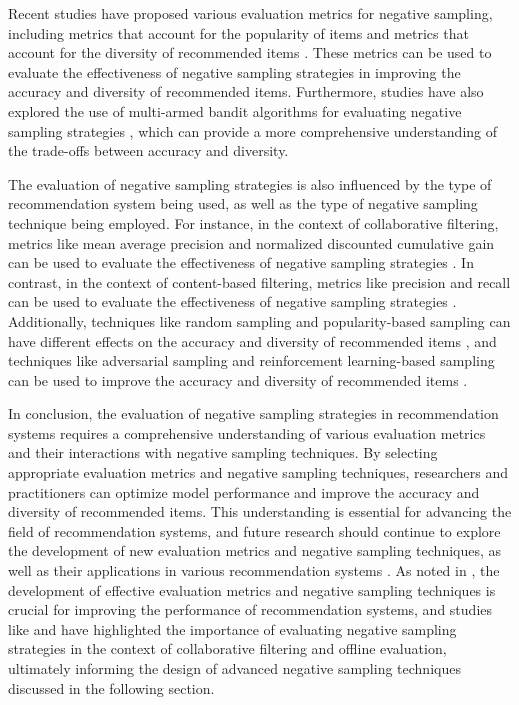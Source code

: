 \documentclass[11pt,a4paper]{article}
\begin{document}
Recent studies have proposed various evaluation metrics for negative sampling, including metrics that account for the popularity of items \cite{arxiv:1802.05382} and metrics that account for the diversity of recommended items \cite{arxiv:1905.06589}. These metrics can be used to evaluate the effectiveness of negative sampling strategies in improving the accuracy and diversity of recommended items. Furthermore, studies have also explored the use of multi-armed bandit algorithms for evaluating negative sampling strategies \cite{doi:10.1287/opre.2016.1508}, which can provide a more comprehensive understanding of the trade-offs between accuracy and diversity.

The evaluation of negative sampling strategies is also influenced by the type of recommendation system being used, as well as the type of negative sampling technique being employed. For instance, in the context of collaborative filtering, metrics like mean average precision and normalized discounted cumulative gain can be used to evaluate the effectiveness of negative sampling strategies \cite{doi:10.23919/eusipco.2017.8081498}. In contrast, in the context of content-based filtering, metrics like precision and recall can be used to evaluate the effectiveness of negative sampling strategies \cite{doi:10.24963/ijcai.2017/446}. Additionally, techniques like random sampling and popularity-based sampling can have different effects on the accuracy and diversity of recommended items \cite{doi:10.1016/j.knosys.2011.07.021}, and techniques like adversarial sampling and reinforcement learning-based sampling can be used to improve the accuracy and diversity of recommended items \cite{doi:10.1145/3097983.3098202}.

In conclusion, the evaluation of negative sampling strategies in recommendation systems requires a comprehensive understanding of various evaluation metrics and their interactions with negative sampling techniques. By selecting appropriate evaluation metrics and negative sampling techniques, researchers and practitioners can optimize model performance and improve the accuracy and diversity of recommended items. This understanding is essential for advancing the field of recommendation systems, and future research should continue to explore the development of new evaluation metrics and negative sampling techniques, as well as their applications in various recommendation systems \cite{arxiv:1707.07435}. As noted in \cite{doi:10.1587/transinf.2017edr0003}, the development of effective evaluation metrics and negative sampling techniques is crucial for improving the performance of recommendation systems, and studies like \cite{doi:10.5220/0004865005640572} and \cite{arxiv:1407.0822} have highlighted the importance of evaluating negative sampling strategies in the context of collaborative filtering and offline evaluation, ultimately informing the design of advanced negative sampling techniques discussed in the following section.
\end{document}
